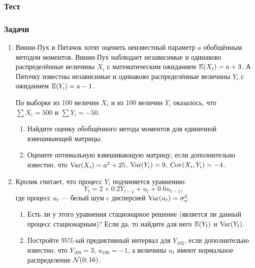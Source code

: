 \subsubsection{Тест}






\subsubsection{Задачи}


\begin{enumerate}
\item Винни-Пух и Пятачок хотят оценить неизвестный параметр $a$ обобщённым методом моментов.
Винни-Пух наблюдает независимые и одинаково распределённые величины $X_i$
с математическим ожиданием $\mathbb{E}(X_i)=a+3$. А Пяточку известны независимые и
одинаково распределённые величины $Y_i$ с ожиданием $\mathbb{E}(Y_i)=a-1$.

По выборке из 100 величин $X_i$ и из 100 величин $Y_i$ оказалось,
что $\sum X_i = 500$ и $\sum Y_i = -50$.

\begin{enumerate}
\item Найдите оценку обобщённого метода моментов для единичной взвешивающей матрицы.
\item Оцените оптимальную взвешивающую матрицу, если дополнительно известно,
что $\operatorname{Var}(X_i)=a^2 + 25$, $\operatorname{Var}(Y_i)=9$, $\operatorname{Cov}(X_i, Y_i)=-4$.
\end{enumerate}

\item Кролик считает, что процесс $Y_i$ подчиняется уравнению:
\[
Y_t = 2 + 0.2 Y_{t-1} + u_t + 0.6 u_{t-1},
\]
где процесс $u_t$ — белый шум c дисперсией $\operatorname{Var}(u_t)=\sigma^2_u$.

\begin{enumerate}
\item Есть ли у этого уравнения стационарное решение (является ли данный процесс стационарным)?
Если да, то найдите для него $\mathbb{E}(Y_t)$ и $\operatorname{Var}(Y_t)$.
\item Постройте 95\%-ый предиктивный интервал для $Y_{102}$, если дополнительно известно,
что $Y_{100}=3$, $u_{100}=-1$, а величины $u_t$ имеют нормальное распределение $\mathcal{N}(0;16)$.
\end{enumerate}


\end{enumerate}
